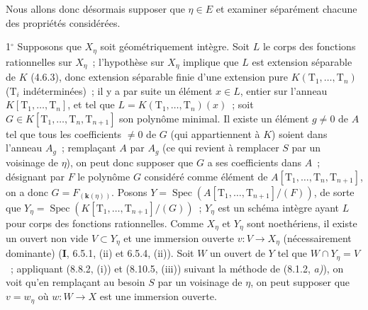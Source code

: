 Nous allons donc désormais supposer que $\eta\in E$ et examiner séparément
chacune des propriétés considérées.

1$^\circ$ Supposons que $X_\eta$ soit géométriquement intègre. Soit $L$ le corps
des fonctions rationnelles sur $X_\eta$~; l'hypothèse sur $X_\eta$ implique que
$L$ est extension séparable de $K$ (4.6.3), donc extension séparable finie d'une
extension pure $K(\mathrm T_1,\ldots,\mathrm T_n)$ ($\mathrm T_i$
indéterminées)~; il y a par suite un élément $x\in L$, entier sur l'anneau
$K[\mathrm T_1,\ldots,\mathrm T_n]$, et tel que
$L=K(\mathrm T_1,\ldots,\mathrm T_n)(x)$~; soit
$G\in K[\mathrm T_1,\ldots,\mathrm T_n,\mathrm T_{n+1}]$ son polynôme minimal.
Il existe un élément $g\neq0$ de $A$ tel que tous les coefficients $\neq0$ de
$G$ (qui appartiennent à $K$) soient dans l'anneau $A_g$~; remplaçant $A$ par
$A_g$ (ce qui revient à remplacer $S$ par un voisinage de $\eta$), on peut donc
supposer que $G$ a ses coefficients dans $A$~; désignant par $F$ le polynôme
$G$ considéré comme élément de
$A[\mathrm T_1,\ldots,\mathrm T_n,\mathrm T_{n+1}]$, on a donc
$G=F_{(\mathbf{k}(\eta))}$. Posons
$Y=\operatorname{Spec}(A[\mathrm T_1,\ldots,\mathrm T_{n+1}]/(F))$, de sorte
que
$Y_\eta=\operatorname{Spec}(K[\mathrm T_1,\ldots,\mathrm T_{n+1}]/(G))$~;
$Y_\eta$ est un schéma intègre ayant $L$ pour corps des fonctions rationnelles.
Comme $X_\eta$ et $Y_\eta$ sont noethériens, il existe un ouvert non vide
$V\subset Y_\eta$ et une immersion ouverte $v:V\to X_\eta$ (nécessairement
dominante) (\textbf{I}, 6.5.1, (ii) et 6.5.4, (ii)). Soit $W$ un ouvert de $Y$
tel que $W\cap Y_\eta=V$~; appliquant (8.8.2, (i)) et (8.10.5, (iii)) suivant
la méthode de (8.1.2, \emph{a)}), on voit qu'en remplaçant au besoin $S$ par un
voisinage de $\eta$, on peut supposer que $v=w_\eta$ où $w:W\to X$ est une
immersion ouverte.


